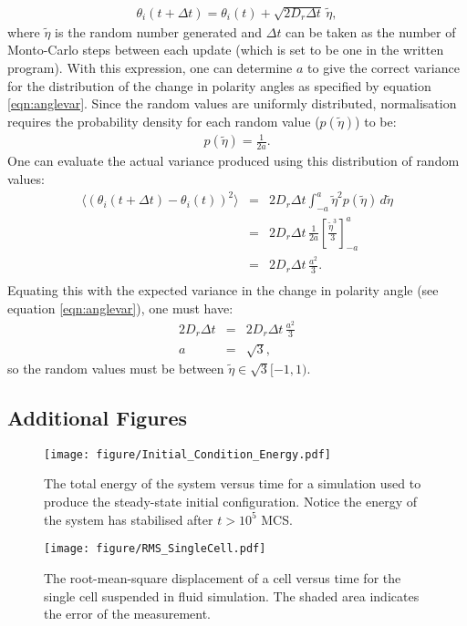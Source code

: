 \documentclass[a4paper,12pt]{article}
\newcommand{\inc}{\Delta}
\begin{document}
\begin{eqnarray}
\theta_i (t + \inc t) = \theta_i (t) + \sqrt{2 D_r \inc t}\, \tilde\eta,
\end{eqnarray}
where $\tilde\eta$ is the random number generated and $\inc t$ can be taken as the number of Monto-Carlo steps between each update (which is set to be one in the written program). With this expression, one can determine $a$ to give the correct variance for the distribution of the change in polarity angles as specified by equation \ref{eqn:anglevar}. Since the random values are uniformly distributed, normalisation requires the probability density for each random value ($p(\tilde\eta)$) to be:
\begin{eqnarray}
p(\tilde\eta) = \frac{1}{2a}.
\end{eqnarray}
One can evaluate the actual variance produced using this distribution of random values:
\begin{eqnarray}
\langle\left(\theta_i(t+\inc t) - \theta_i(t)\right)^2\rangle & = & 2D_r\inc t \int_{-a}^{a} \tilde\eta^2 p(\tilde\eta)\, d\tilde\eta\\
& = & 2D_r\inc t\,\frac{1}{2a}\left[\frac{\tilde\eta^3}{3}\right]_{-a}^{a}\\
& = & 2D_r\inc t\,\frac{a^2}{3}.\\
\end{eqnarray}
Equating this with the expected variance in the change in polarity angle (see equation \ref{eqn:anglevar}), one must have:
\begin{eqnarray}
2D_r \inc t & = & 2D_r\inc t\,\frac{a^2}{3}\\
a & = & \sqrt{3},
\end{eqnarray}
so the random values must be between $\tilde\eta \in \sqrt{3}[-1,1)$.

\subsection{Additional Figures}
\label{app:addfig}
\begin{figure}[h]
\centering
\texttt{[image: figure/Initial\_Condition\_Energy.pdf]}
\caption{The total energy of the system versus time for a simulation used to produce the steady-state initial configuration. Notice the energy of the system has stabilised after $t > 10^5$ MCS.}
\label{fig:energyinitcondition}
\end{figure}
\begin{figure}[h]
\centering
\texttt{[image: figure/RMS\_SingleCell.pdf]}
\caption{The root-mean-square displacement of a cell versus time for the single cell suspended in fluid simulation. The shaded area indicates the error of the measurement.}
\label{fig:rmssinglecell}
\end{figure}
\FloatBarrier
\end{document}
